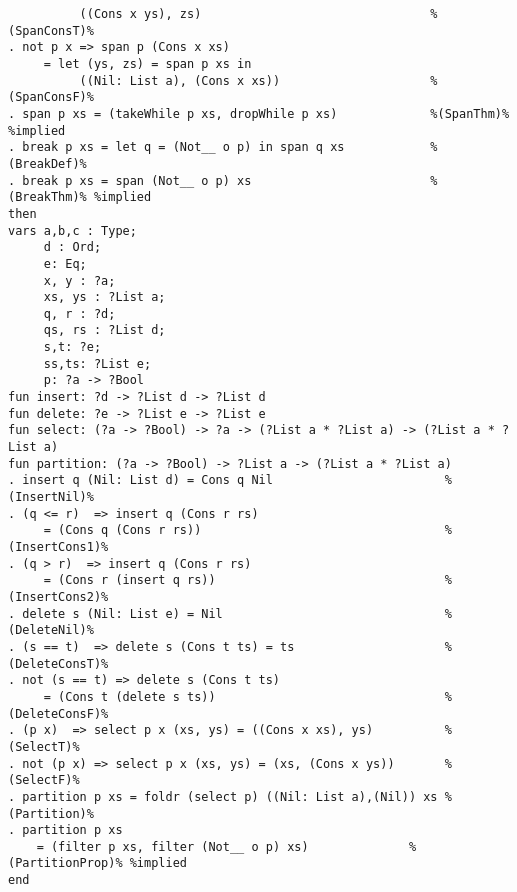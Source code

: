 \begin{Verbatim}
          ((Cons x ys), zs)                                %(SpanConsT)%
. not p x => span p (Cons x xs)
     = let (ys, zs) = span p xs in
          ((Nil: List a), (Cons x xs))                     %(SpanConsF)%
. span p xs = (takeWhile p xs, dropWhile p xs)             %(SpanThm)% %implied
. break p xs = let q = (Not__ o p) in span q xs            %(BreakDef)%
. break p xs = span (Not__ o p) xs                         %(BreakThm)% %implied
then
vars a,b,c : Type;
     d : Ord;
     e: Eq;
     x, y : ?a;
     xs, ys : ?List a;
     q, r : ?d;
     qs, rs : ?List d;
     s,t: ?e;
     ss,ts: ?List e;
     p: ?a -> ?Bool
fun insert: ?d -> ?List d -> ?List d
fun delete: ?e -> ?List e -> ?List e
fun select: (?a -> ?Bool) -> ?a -> (?List a * ?List a) -> (?List a * ?List a)
fun partition: (?a -> ?Bool) -> ?List a -> (?List a * ?List a)
. insert q (Nil: List d) = Cons q Nil                        %(InsertNil)%
. (q <= r)  => insert q (Cons r rs) 
     = (Cons q (Cons r rs))                                  %(InsertCons1)%
. (q > r)  => insert q (Cons r rs) 
     = (Cons r (insert q rs))                                %(InsertCons2)%
. delete s (Nil: List e) = Nil                               %(DeleteNil)%
. (s == t)  => delete s (Cons t ts) = ts                     %(DeleteConsT)%
. not (s == t) => delete s (Cons t ts) 
     = (Cons t (delete s ts))                                %(DeleteConsF)%
. (p x)  => select p x (xs, ys) = ((Cons x xs), ys)          %(SelectT)%
. not (p x) => select p x (xs, ys) = (xs, (Cons x ys))       %(SelectF)%
. partition p xs = foldr (select p) ((Nil: List a),(Nil)) xs %(Partition)%
. partition p xs 
    = (filter p xs, filter (Not__ o p) xs)              %(PartitionProp)% %implied
end
\end{Verbatim}

